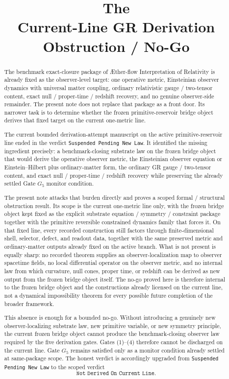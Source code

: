 \documentclass[11pt]{article}
\title{\textbf{The \TheoryName{}}\\[0.4em]
\large Current-Line GR Derivation\\
\large Obstruction / No-Go}
\author{}
\date{}
\newcommand{\Aflow}{\AE{}ther-flow}
\newcommand{\TheoryName}{\Aflow{} Interpretation of Relativity}
\newcommand{\GateFive}{G_{5}}
\begin{document}
\maketitle

\begin{abstract}
The benchmark exact-closure package of \TheoryName{} is already fixed as the observer-level target: one operative metric, Einsteinian observer dynamics with universal matter coupling, ordinary relativistic gauge / two-tensor content, exact null / proper-time / redshift recovery, and no genuine observer-side remainder. The present note does not replace that package as a front door. Its narrower task is to determine whether the frozen primitive-reservoir bridge object derives that fixed target on the current one-metric line.

The current bounded derivation-attempt manuscript on the active primitive-reservoir line ended in the verdict \texttt{Suspended Pending New Law}. It identified the missing ingredient precisely: a benchmark-closing substrate law on the frozen bridge object that would derive the operative observer metric, the Einsteinian observer equation or Einstein--Hilbert plus ordinary-matter form, the ordinary GR gauge / two-tensor content, and exact null / proper-time / redshift recovery while preserving the already settled Gate \(\GateFive\) monitor condition.

The present note attacks that burden directly and proves a scoped formal / structural obstruction result. Its scope is the current one-metric line only, with the frozen bridge object kept fixed as the explicit substrate equation / symmetry / constraint package together with the primitive reversible constrained dynamics family that forces it. On that fixed line, every recorded construction still factors through finite-dimensional shell, selector, defect, and readout data, together with the same preserved metric and ordinary-matter outputs already fixed on the active branch. What is not present is equally sharp: no recorded theorem supplies an observer-localization map to observer spacetime fields, no local differential operator on the observer metric, and no internal law from which curvature, null cones, proper time, or redshift can be derived as new output from the frozen bridge object itself. The no-go proved here is therefore internal to the frozen bridge object and the constructions already licensed on the current line, not a dynamical impossibility theorem for every possible future completion of the broader framework.

This absence is enough for a bounded no-go. Without introducing a genuinely new observer-localizing substrate law, new primitive variable, or new symmetry principle, the current frozen bridge object cannot produce the benchmark-closing observer law required by the five derivation gates. Gates (1)--(4) therefore cannot be discharged on the current line. Gate \(\GateFive\) remains satisfied only as a monitor condition already settled at same-package scope. The honest verdict is accordingly upgraded from \texttt{Suspended Pending New Law} to the scoped verdict
\[
\texttt{Not Derived On Current Line}.
\]
\end{abstract}
\end{document}
